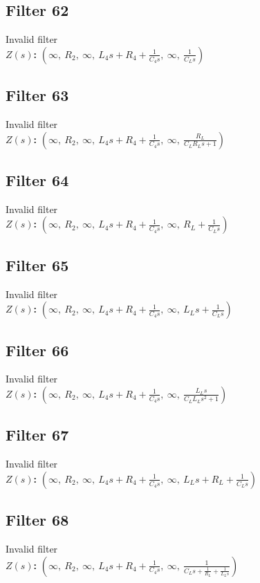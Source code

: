 \documentclass{article}
\begin{document}
\subsection*{Filter 62}
Invalid filter \\ 
\textbf{$Z(s)$:} $\left( \infty, \  R_{2}, \  \infty, \  L_{4} s + R_{4} + \frac{1}{C_{4} s}, \  \infty, \  \frac{1}{C_{L} s}\right)$ \\ 
\subsection*{Filter 63}
Invalid filter \\ 
\textbf{$Z(s)$:} $\left( \infty, \  R_{2}, \  \infty, \  L_{4} s + R_{4} + \frac{1}{C_{4} s}, \  \infty, \  \frac{R_{L}}{C_{L} R_{L} s + 1}\right)$ \\ 
\subsection*{Filter 64}
Invalid filter \\ 
\textbf{$Z(s)$:} $\left( \infty, \  R_{2}, \  \infty, \  L_{4} s + R_{4} + \frac{1}{C_{4} s}, \  \infty, \  R_{L} + \frac{1}{C_{L} s}\right)$ \\ 
\subsection*{Filter 65}
Invalid filter \\ 
\textbf{$Z(s)$:} $\left( \infty, \  R_{2}, \  \infty, \  L_{4} s + R_{4} + \frac{1}{C_{4} s}, \  \infty, \  L_{L} s + \frac{1}{C_{L} s}\right)$ \\ 
\subsection*{Filter 66}
Invalid filter \\ 
\textbf{$Z(s)$:} $\left( \infty, \  R_{2}, \  \infty, \  L_{4} s + R_{4} + \frac{1}{C_{4} s}, \  \infty, \  \frac{L_{L} s}{C_{L} L_{L} s^{2} + 1}\right)$ \\ 
\subsection*{Filter 67}
Invalid filter \\ 
\textbf{$Z(s)$:} $\left( \infty, \  R_{2}, \  \infty, \  L_{4} s + R_{4} + \frac{1}{C_{4} s}, \  \infty, \  L_{L} s + R_{L} + \frac{1}{C_{L} s}\right)$ \\ 
\subsection*{Filter 68}
Invalid filter \\ 
\textbf{$Z(s)$:} $\left( \infty, \  R_{2}, \  \infty, \  L_{4} s + R_{4} + \frac{1}{C_{4} s}, \  \infty, \  \frac{1}{C_{L} s + \frac{1}{R_{L}} + \frac{1}{L_{L} s}}\right)$ \\ 
\end{document}
